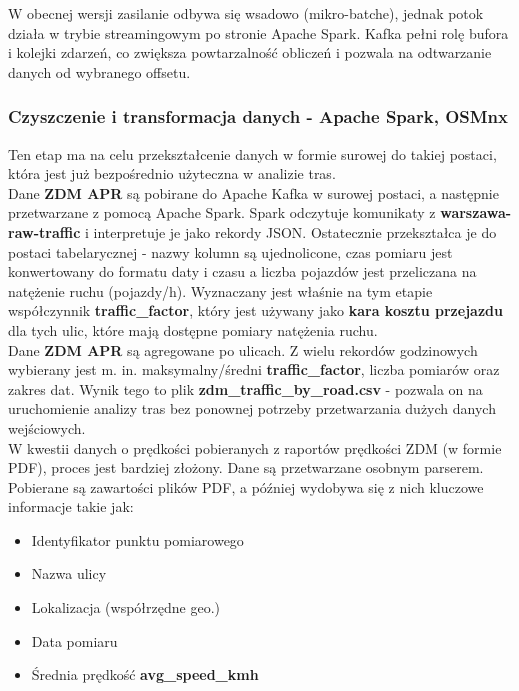 \documentclass[12pt]{article}
\begin{document}
W obecnej wersji zasilanie odbywa się wsadowo (mikro-batche), jednak potok działa w trybie
streamingowym po stronie Apache Spark. Kafka pełni rolę bufora i kolejki zdarzeń,
co zwiększa powtarzalność obliczeń i pozwala na odtwarzanie danych od wybranego offsetu.

\subsubsection{Czyszczenie i transformacja danych - Apache Spark, OSMnx}

\noindent Ten etap ma na celu przekształcenie danych w formie surowej do takiej postaci, która jest już bezpośrednio użyteczna w analizie tras.\\

\noindent Dane \textbf{ZDM APR} są pobirane do Apache Kafka w surowej postaci, a następnie przetwarzane z pomocą Apache Spark. Spark odczytuje komunikaty z \textbf{warszawa-raw-traffic} i interpretuje je jako rekordy JSON. Ostatecznie przekształca je do postaci tabelarycznej - nazwy kolumn są ujednolicone, czas pomiaru jest konwertowany do formatu daty i czasu a liczba pojazdów jest przeliczana na natężenie ruchu (pojazdy/h). Wyznaczany jest właśnie na tym etapie współczynnik \textbf{traffic\_factor}, który jest używany jako \textbf{kara kosztu przejazdu} dla tych ulic, które mają dostępne pomiary natężenia ruchu.\\

\noindent Dane \textbf{ZDM APR} są agregowane po ulicach. Z wielu rekordów godzinowych wybierany jest m. in. maksymalny/średni \textbf{traffic\_factor}, liczba pomiarów oraz zakres dat. Wynik tego to plik \textbf{zdm\_traffic\_by\_road.csv} - pozwala on na uruchomienie analizy tras bez ponownej potrzeby przetwarzania dużych danych wejściowych.\\

\noindent W kwestii danych o prędkości pobieranych z raportów prędkości ZDM (w formie PDF), proces jest bardziej złożony. Dane są przetwarzane osobnym parserem. Pobierane są zawartości plików PDF, a później wydobywa się z nich kluczowe informacje takie jak:
\begin{itemize}
    \item Identyfikator punktu pomiarowego
    \item Nazwa ulicy
    \item Lokalizacja (współrzędne geo.)
    \item Data pomiaru
    \item Średnia prędkość \textbf{avg\_speed\_kmh}
    
\end{itemize}
\end{document}
